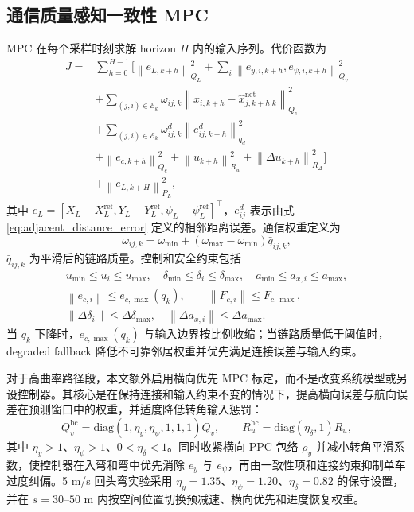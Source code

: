\documentclass[twocolumn,3p,times,procedia]{elsarticle}
\newcommand{\norm}[1]{\left\lVert #1 \right\rVert}
\begin{document}
\subsection{通信质量感知一致性 MPC}

MPC 在每个采样时刻求解 horizon $H$ 内的输入序列。代价函数为
\begin{equation}
\begin{aligned}
J=&\sum_{h=0}^{H-1}
\Big[
\norm{e_{L,k+h}}_{Q_L}^2+
\sum_i\norm{e_{y,i,k+h},e_{\psi,i,k+h}}_{Q_v}^2\\
&+\sum_{(j,i)\in\mathcal E_k}\omega_{ij,k}\norm{x_{i,k+h}-\hat x_{j,k+h|k}^{\mathrm{net}}}_{Q_c}^2\\
&+\sum_{(j,i)\in\mathcal E_k}\omega^d_{ij,k}\norm{e^d_{ij,k+h}}_{q_d}^2\\
&+\norm{e_{c,k+h}}_{Q_e}^2+
\norm{u_{k+h}}_{R_u}^2+
\norm{\Delta u_{k+h}}_{R_\Delta}^2
\Big]\\
&+\norm{e_{L,k+H}}_{P_L}^2 ,
\end{aligned}
\label{eq:mpc_cost}
\end{equation}
其中 $e_L=[X_L-X_L^{\mathrm{ref}},Y_L-Y_L^{\mathrm{ref}},\psi_L-\psi_L^{\mathrm{ref}}]^\top$，$e^d_{ij}$ 表示由式 \eqref{eq:adjacent_distance_error} 定义的相邻距离误差。通信权重定义为
\begin{equation}
\omega_{ij,k}=\omega_{\min}+(\omega_{\max}-\omega_{\min})\bar q_{ij,k},
\label{eq:comm_weight}
\end{equation}
$\bar q_{ij,k}$ 为平滑后的链路质量。控制和安全约束包括
\begin{equation}
\begin{gathered}
u_{\min}\le u_i\le u_{\max},\quad
\delta_{\min}\le\delta_i\le\delta_{\max},\quad
a_{\min}\le a_{x,i}\le a_{\max},\\
\norm{e_{c,i}}\le e_{c,\max}(q_k),\qquad
\norm{F_{c,i}}\le F_{c,\max},\\
\norm{\Delta \delta_i}\le \Delta\delta_{\max},\quad
\norm{\Delta a_{x,i}}\le \Delta a_{\max}.
\end{gathered}
\label{eq:constraints}
\end{equation}
当 $q_k$ 下降时，$e_{c,\max}(q_k)$ 与输入边界按比例收缩；当链路质量低于阈值时，degraded fallback 降低不可靠邻居权重并优先满足连接误差与输入约束。

对于高曲率路径段，本文额外启用横向优先 MPC 标定，而不是改变系统模型或另设控制器。其核心是在保持连接和输入约束不变的情况下，提高横向误差与航向误差在预测窗口中的权重，并适度降低转角输入惩罚：
\begin{equation}
Q_v^{\mathrm{hc}}=\mathrm{diag}(1,\eta_y,\eta_\psi,1,1,1)Q_v,\qquad
R_u^{\mathrm{hc}}=\mathrm{diag}(\eta_\delta,1)R_u ,
\label{eq:high_curvature_lateral_priority}
\end{equation}
其中 $\eta_y>1$、$\eta_\psi>1$、$0<\eta_\delta<1$。同时收紧横向 PPC 包络 $\rho_y$ 并减小转角平滑系数，使控制器在入弯和弯中优先消除 $e_y$ 与 $e_\psi$，再由一致性项和连接约束抑制单车过度纠偏。5 m/s 回头弯实验采用 $\eta_y=1.35$、$\eta_\psi=1.20$、$\eta_\delta=0.82$ 的保守设置，并在 $s=30$--$50$ m 内按空间位置切换预减速、横向优先和进度恢复权重。
\end{document}
